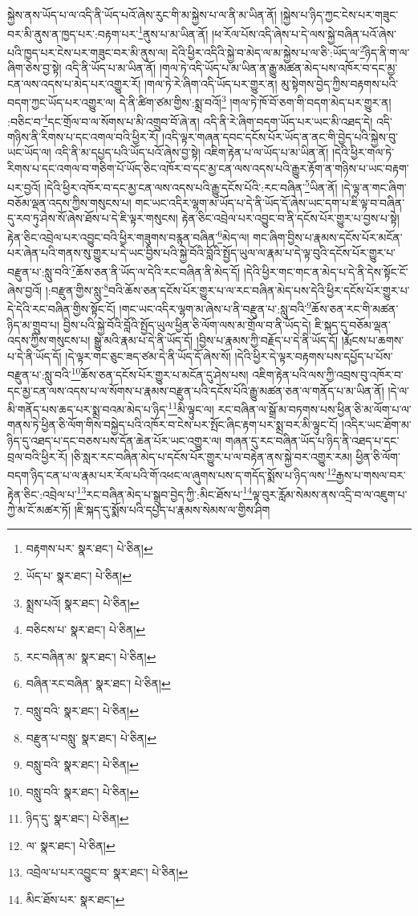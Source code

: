 སྐྱེས་ནས་ཡོད་པ་ལ་འདི་ནི་ཡོད་པའོ་ཞེས་རུང་གི་མ་སྐྱེས་པ་ལ་ནི་མ་ཡིན་ནོ། །སྐྱེས་པ་ཉིད་ཀྱང་ངེས་པར་གཟུང་བར་མི་ནུས་ན་ཁྱད་པར་:བརྟག་པར་\footnote{བརྟགས་པར་  སྣར་ཐང་།  པེ་ཅིན། }ནུས་པ་མ་ཡིན་ནོ། །ཕ་རོལ་པོས་འདི་ཞེས་པ་དེ་ལས་སྐྱེ་བཞིན་པའོ་ཞེས་པའི་ཁྱད་པར་ངེས་པར་གཟུང་བར་མི་ནུས་ལ། དེའི་ཕྱིར་འདིའི་སྐྱེ་བ་མེད་ལ་མ་སྐྱེས་པ་ལ་ཅི་:ཡོད་ལ་\footnote{ཡོད་པ་  སྣར་ཐང་།  པེ་ཅིན། }ཉིད་ནི་ག་ལ་ཞིག་ཅེས་བྱ་སྟེ། འདི་ནི་ཡོད་པ་མ་ཡིན་ནོ། །གལ་ཏེ་འདི་ཡོད་པ་མ་ཡིན་ན་རྒྱུ་མཚན་མེད་པས་འཁོར་བ་དང་མྱ་ངན་ལས་འདས་པ་མེད་པར་འགྱུར་རོ། །གལ་ཏེ་རེ་ཞིག་འདི་ཡོད་པར་གྱུར་ན། མུ་སྟེགས་བྱེད་ཀྱིས་བརྟགས་པའི་བདག་ཀྱང་ཡོད་པར་འགྱུར་ལ། དེ་ནི་ཚིག་ཙམ་གྱིས་:སྨྲ་བའོ།\footnote{སྨྲས་པའོ།  སྣར་ཐང་།  པེ་ཅིན། } །གལ་ཏེ་ཁོ་བོ་ཅག་གི་བདག་མེད་པར་གྱུར་ན། :བཅིང་བ་\footnote{བཅིངས་པ་  སྣར་ཐང་།  པེ་ཅིན། }དང་གྲོལ་བ་ལ་སོགས་པ་མི་འགྲུབ་བོ་ཞེ་ན། འདི་ནི་རེ་ཞིག་བདག་ཡོད་པར་ཡང་མི་འཐད་དེ། འདི་གཉིས་ནི་རིགས་པ་དང་འགལ་བའི་ཕྱིར་རོ། །འདི་ལྟར་གཞན་དབང་དངོས་པོར་ཡོད་ན་ནང་གི་བྱེད་པའི་སྐྱེས་བུ་ཡང་ཡོད་ལ། འདི་ནི་མ་དཔྱད་པའི་ཡོད་པའོ་ཞེས་བྱ་སྟེ། འཇིག་རྟེན་པ་ལ་ཡོད་པ་མ་ཡིན་ནོ། །དེའི་ཕྱིར་གལ་ཏེ་རིགས་པ་དང་འགལ་བ་གཅིག་པོ་ཡོད་ཅིང་འཁོར་བ་དང་མྱ་ངན་ལས་འདས་པའི་རྒྱུར་རྟོག་ན་གཉིས་པ་ཡང་བརྟག་པར་བྱའོ། །དེའི་ཕྱིར་འཁོར་བ་དང་མྱ་ངན་ལས་འདས་པའི་རྒྱུ་དངོས་པོའི་:རང་བཞིན་\footnote{རང་བཞིན་མ་  སྣར་ཐང་།  པེ་ཅིན། }ཡིན་ནོ། །དེ་ལྟ་ན་གང་ཞིག་བཅོམ་ལྡན་འདས་ཀྱིས་གསུངས་པ། གང་ཡང་འདིར་ལྷག་མ་ཡོད་པ་དེ་ནི་ཡོད་དོ་ཞེས་ཡང་དག་པ་ཇི་ལྟ་བ་བཞིན་དུ་རབ་ཏུ་ཤེས་སོ་ཞེས་ཐོས་པ་དེ་ཇི་ལྟར་གསུངས། རྟེན་ཅིང་འབྲེལ་པར་འབྱུང་བ་ནི་དངོས་པོར་གྱུར་པ་བྱས་པ་སྟེ། རྟེན་ཅིང་འབྲེལ་པར་འབྱུང་བའི་ཕྱིར་གཟུགས་བརྙན་བཞིན་\footnote{བཞིན་རང་བཞིན་  སྣར་ཐང་།  པེ་ཅིན། }མེད་ལ། གང་ཞིག་བྱིས་པ་རྣམས་དངོས་པོར་མངོན་པར་ཞེན་པའི་གནས་སུ་གྱུར་པ་དེ་ཡང་བྱིས་པའི་སྐྱེ་བོའི་བློའི་སྤྱོད་ཡུལ་ལ་རྣམ་པ་དེ་ལྟ་བུའི་དངོས་པོར་གྱུར་པ་བརྫུན་པ་:སླུ་བའི་\footnote{བསླུ་བའི་  སྣར་ཐང་།  པེ་ཅིན། }ཆོས་ཅན་ནི་ཡོད་ལ་དེའི་རང་བཞིན་ནི་མེད་དོ། །དེའི་ཕྱིར་གང་གང་ན་མེད་པ་དེ་ནི་དེས་སྟོང་ངོ་ཞེས་བྱའོ། །:བརྫུན་གྱིས་སླུ་\footnote{བརྫུན་པ་བསླུ་  སྣར་ཐང་།  པེ་ཅིན། }བའི་ཆོས་ཅན་དངོས་པོར་གྱུར་པ་ལ་རང་བཞིན་མེད་པས་དེའི་ཕྱིར་དངོས་པོར་གྱུར་པ་དེ་དེའི་རང་བཞིན་གྱིས་སྟོང་ངོ། །གང་ཡང་འདིར་ལྷག་མ་ཞེས་པ་ནི་བརྫུན་པ་:སླུ་བའི་\footnote{བསླུ་བའི་  སྣར་ཐང་།  པེ་ཅིན། }ཆོས་ཅན་རང་གི་མཚན་ཉིད་མ་གྲུབ་པ། བྱིས་པའི་སྐྱེ་བོའི་བློའི་སྤྱོད་ཡུལ་ཕྱིན་ཅི་ལོག་ལས་མ་གྲོལ་བ་ནི་ཡོད་དེ། ཇི་སྐད་དུ་བཅོམ་ལྡན་འདས་ཀྱིས་གསུངས་པ། སྒྱུ་མའི་རྣམ་པ་དེ་ནི་ཡོད་དོ། །བྱིས་པ་རྣམས་ཀྱི་བརྗོད་པ་དེ་ནི་ཡོད་དོ། །རྨོངས་པ་ཆགས་པ་དེ་ནི་ཡོད་དོ། །དེ་ལྟར་གང་ཅུང་ཟད་ཙམ་དེ་ནི་ཡོད་དོ་ཞེས་སོ། །དེའི་ཕྱིར་དེ་ལྟར་བརྟགས་པས་དཔྱོད་པ་པོས་བརྫུན་པ་:སླུ་བའི་\footnote{བསླུ་བའི་  སྣར་ཐང་།  པེ་ཅིན། }ཆོས་ཅན་དངོས་པོར་གྱུར་པ་མངོན་དུ་ཤེས་པས། འཇིག་རྟེན་པའི་ལས་ཀྱི་འབྲས་བུ་འཁོར་བ་དང་མྱ་ངན་ལས་འདས་པ་ལ་སོགས་པ་རྣམས་བརྫུན་པའི་དངོས་པོའི་རྒྱུ་མཚན་ཅན་ལ་གནོད་པ་མ་ཡིན་ནོ། །དེ་ལ་མི་གནོད་པས་ཆད་པར་སྨྲ་བའམ་མེད་པ་ཉིད་\footnote{ཉིད་དུ་  སྣར་ཐང་།  པེ་ཅིན། }མི་ལྟུང་ལ། རང་བཞིན་ལ་སྒྲོ་མ་བཏགས་པས་ཕྱིན་ཅི་མ་ལོག་པ་ལ་གནས་ཏེ་ཕྱིན་ཅི་ལོག་གིས་བསྐྱེད་པའི་འཁོར་བ་ངེས་པར་སྤོང་ཞིང་རྟག་པར་སྨྲ་བར་མི་ལྟུང་ངོ། །འདིར་ཡང་ཐོག་མ་ཉིད་དུ་འཐད་པ་དང་བཅས་པས་དོན་ཆེན་པོར་ཡང་འགྱུར་ལ། གཞན་དུ་རང་བཞིན་ཡོད་པ་ཉིད་ནི་འཐད་པ་དང་བྲལ་བའི་ཕྱིར་རོ། །ཅི་སླར་རང་བཞིན་མེད་པ་དངོས་པོར་གྱུར་པ་ལ་བརྟེན་ནས་སྐྱེ་བར་འགྱུར་རམ། ཕྱིན་ཅི་ལོག་བདག་ཉིད་ངན་པ་ལ་རྣམ་པར་རོལ་པའི་གོ་འཕང་ལ་ཞུགས་པས་ད་གདོད་སྨོས་པ་ཉིད་ལས་\footnote{ལ་  སྣར་ཐང་།  པེ་ཅིན། }རྒྱས་པ་གསལ་བར་རྟེན་ཅིང་:འབྲེལ་པ་\footnote{འབྲེལ་པ་པར་འབྱུང་བ་  སྣར་ཐང་།  པེ་ཅིན། }རང་བཞིན་མེད་པ་སྒྲུབ་བྱེད་ཀྱི་:མིང་ཐོས་པ་\footnote{མིང་ཐོས་པར་  སྣར་ཐང་། }ལྟ་བུར་རློམ་སེམས་ནས་འདྲི་བ་ལ་འཇུག་པ་ཀྱེ་མ་ངོ་མཚར་ཏོ། །ཇི་སྐད་དུ་སྨོས་པའི་དཔྱད་པ་རྣམས་སེམས་ལ་གྱིས་ཤིག 